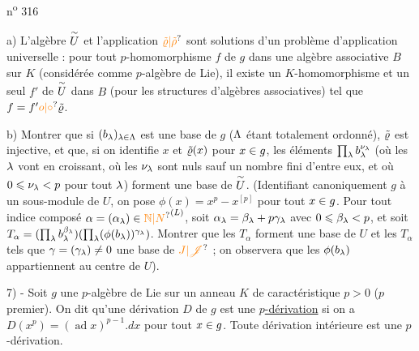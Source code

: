 \hfill n\textsuperscript{o} 316

a) L'algèbre $\overset{\sim}{U}$ et l'application $\handwritten{\unsure{\tilde{\varrho}|\tilde{\rho}}}$ sont solutions d'un problème d'application universelle : pour tout $p$-homomorphisme $f$ de $g$ dans une algèbre associative $B$ sur $K$ (considérée comme $p$-algèbre de Lie), il existe un $K$-homomorphisme et un seul $f'$ de $\overset{\sim}{U}$ dans $B$ (pour les structures d'algèbres associatives) tel que $f=f'\unsure{o|\circ}\handwritten{\tilde{\varrho}}$.

b) Montrer que si $(b_{\lambda})_{\lambda\in\Lambda}$ est une base de $g$ ($\Lambda$ étant totalement ordonné), $\tilde{\varrho}$ est injective, et que, si on identifie $x$ et $\tilde{\varrho}(x)$ pour $x\in g$, les éléments $\prod_{\lambda}b_{\lambda}^{\nu_{\lambda}}$ (où les $\lambda$ vont en croissant, où les $\nu_{\lambda}$ sont nuls sauf un nombre fini d'entre eux, et où $0\leqslant\nu_{\lambda}<p$ pour tout $\lambda$) forment une base de $\overset{\sim}{U}$. (Identifiant canoniquement $g$ à un sous-module de $U$, on pose $\phi(x)=x^{p}-x^{[p]}$ pour tout $x\in g$. Pour tout indice composé $\alpha=(\alpha_{\handwritten{\lambda}})\handwritten{\in}\unsure{\mathbb{N}|N}^{(L)}$, soit $\alpha_{\lambda}=\beta_{\lambda}+p\gamma_{\lambda}$ avec $0\leqslant\beta_{\lambda}<p$, et soit $T_{\alpha}=(\prod_{\lambda}b_{\lambda}^{\beta_{\lambda}})(\prod_{\lambda}(\phi(b_{\lambda}))^{\gamma_{\lambda}})$. Montrer que les $T_{\alpha}$ forment une base de $U$ et les $T_{\alpha}$ tels que $\gamma=(\gamma_{\lambda})\ne 0$ une base de $\unsure{J|\mathscr{J}}$ ; on observera que les $\phi(b_{\lambda})$ appartiennent au centre de $U$).

7) - Soit $g$ une $p$-algèbre de Lie sur un anneau $K$ de caractéristique $p>0$ ($p$ premier). On dit qu'une dérivation $D$ de $g$ est une $p$\uline{-dérivation} si on a $D(x^{p})=(\operatorname{ad}x)^{p-1}.dx$ pour tout $x\in g$. Toute dérivation intérieure est une $p$-dérivation.

